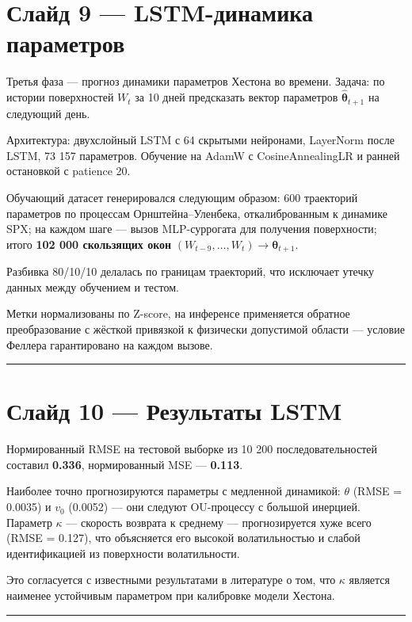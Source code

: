 \documentclass[12pt,a4paper]{article}
\begin{document}
\section*{Слайд 9 — LSTM-динамика параметров}

Третья фаза — прогноз динамики параметров Хестона во времени. Задача: по истории поверхностей $W_t$ за 10 дней предсказать вектор параметров $\hat{\boldsymbol\theta}_{t+1}$ на следующий день.

Архитектура: двухслойный LSTM с 64 скрытыми нейронами, LayerNorm после LSTM, 73 157 параметров. Обучение на AdamW с CosineAnnealingLR и ранней остановкой с patience 20.

Обучающий датасет генерировался следующим образом: 600 траекторий параметров по процессам Орнштейна–Уленбека, откалиброванным к динамике SPX; на каждом шаге — вызов MLP-суррогата для получения поверхности; итого \textbf{102 000 скользящих окон} $(W_{t-9}, \ldots, W_t) \to \boldsymbol\theta_{t+1}$.

Разбивка 80/10/10 делалась по границам траекторий, что исключает утечку данных между обучением и тестом.

Метки нормализованы по Z-score, на инференсе применяется обратное преобразование с жёсткой привязкой к физически допустимой области — условие Феллера гарантировано на каждом вызове.

\vspace{1em}\hrule\vspace{1em}

\section*{Слайд 10 — Результаты LSTM}

Нормированный RMSE на тестовой выборке из 10 200 последовательностей составил \textbf{0.336}, нормированный MSE — \textbf{0.113}.

Наиболее точно прогнозируются параметры с медленной динамикой: $\theta$ (RMSE = 0.0035) и $v_0$ (0.0052) — они следуют OU-процессу с большой инерцией. Параметр $\kappa$ — скорость возврата к среднему — прогнозируется хуже всего (RMSE = 0.127), что объясняется его высокой волатильностью и слабой идентификацией из поверхности волатильности.

Это согласуется с известными результатами в литературе о том, что $\kappa$ является наименее устойчивым параметром при калибровке модели Хестона.

\vspace{1em}\hrule\vspace{1em}
\end{document}
